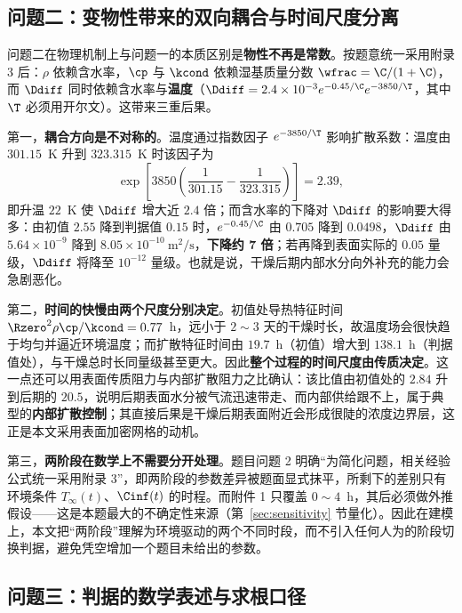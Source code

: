 \subsection{问题二：变物性带来的双向耦合与时间尺度分离}

问题二在物理机制上与问题一的本质区别是\textbf{物性不再是常数}。按题意统一采用附录 3 后：$\rho$ 依赖含水率，$\cp$ 与 $\kcond$ 依赖湿基质量分数 $\wfrac=\C/(1+\C)$，而 $\Ddiff$ 同时依赖含水率与\textbf{温度}（$\Ddiff=2.4\times10^{-3}e^{-0.45/\C}e^{-3850/\T}$，其中 $\T$ 必须用开尔文）。这带来三重后果。

第一，\textbf{耦合方向是不对称的}。温度通过指数因子 $e^{-3850/\T}$ 影响扩散系数：温度由 $301.15$~K 升到 $323.315$~K 时该因子为
\begin{equation}
\exp\!\left[3850\left(\frac{1}{301.15}-\frac{1}{323.315}\right)\right]=2.39,
\end{equation}
即升温 $22$~K 使 $\Ddiff$ 增大近 $2.4$ 倍；而含水率的下降对 $\Ddiff$ 的影响要大得多：由初值 $2.55$ 降到判据值 $0.15$ 时，$e^{-0.45/\C}$ 由 $0.705$ 降到 $0.0498$，$\Ddiff$ 由 $5.64\times10^{-9}$ 降到 $8.05\times10^{-10}~\mathrm{m^2/s}$，\textbf{下降约 7 倍}；若再降到表面实际的 $0.05$ 量级，$\Ddiff$ 将降至 $10^{-12}$ 量级。也就是说，干燥后期内部水分向外补充的能力会急剧恶化。

第二，\textbf{时间的快慢由两个尺度分别决定}。初值处导热特征时间 ${\Rzero}^2\rho\cp/\kcond=0.77$~h，远小于 $2\sim3$ 天的干燥时长，故温度场会很快趋于均匀并逼近环境温度；而扩散特征时间由 $19.7$~h（初值）增大到 $138.1$~h（判据值处），与干燥总时长同量级甚至更大。因此\textbf{整个过程的时间尺度由传质决定}。这一点还可以用表面传质阻力与内部扩散阻力之比确认：该比值由初值处的 $2.84$ 升到后期的 $20.5$，说明后期表面水分被气流迅速带走、而内部供给跟不上，属于典型的\textbf{内部扩散控制}；其直接后果是干燥后期表面附近会形成很陡的浓度边界层，这正是本文采用表面加密网格的动机。

第三，\textbf{两阶段在数学上不需要分开处理}。题目问题 2 明确``为简化问题，相关经验公式统一采用附录 3''，即两阶段的参数差异被题面显式抹平，所剩下的差别只有环境条件 $T_\infty(t)$、$\Cinf(t)$ 的时程。而附件 1 只覆盖 $0\sim4$~h，其后必须做外推假设——这是本题最大的不确定性来源（第~\ref{sec:sensitivity} 节量化）。因此在建模上，本文把``两阶段''理解为环境驱动的两个不同时段，而不引入任何人为的阶段切换判据，避免凭空增加一个题目未给出的参数。

\subsection{问题三：判据的数学表述与求根口径}

